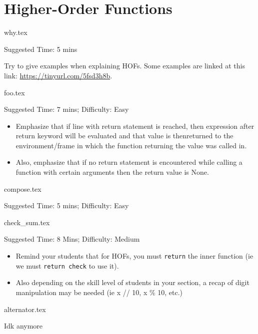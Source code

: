 \documentclass{exam}
\begin{document}
\section{Higher-Order Functions}
\begin{questions}
    {why.tex}
    \begin{questionmeta}
        Suggested Time: 5 mins
        
        Try to give examples when explaining HOFs. Some examples are linked at this link: \url{https://tinyurl.com/5fsd3h8b}.
    \end{questionmeta}
    {foo.tex}
    \begin{questionmeta}
        Suggested Time: 7 mins; Difficulty: Easy
        \begin{itemize}
            \item Emphasize that if line with return statement is reached, then expression after return keyword will be evaluated and that value is thenreturned to the environment/frame in which the function returning the value was called in. 
            \item Also, emphasize that if no return statement is encountered while calling a function with certain arguments then the return value is None.
        \end{itemize}
    \end{questionmeta}
    {compose.tex}
    \begin{questionmeta}
        Suggested Time: 5 mins; Difficulty: Easy
    \end{questionmeta}
    {check_sum.tex}
    \begin{questionmeta}
        Suggested Time: 8 Mins; Difficulty: Medium
        \begin{itemize}
            \item Remind your students that for HOFs, you must \lstinline{return} the inner function (ie we must \lstinline{return check} to use it).
            \item Also depending on the skill level of students in your section, a recap of digit manipulation may be needed (ie x // 10, x \% 10, etc.)
        \end{itemize}
    \end{questionmeta}
    {alternator.tex}
    \begin{questionmeta}
        Idk anymore
    \end{questionmeta}

\end{questions}
\end{document}
